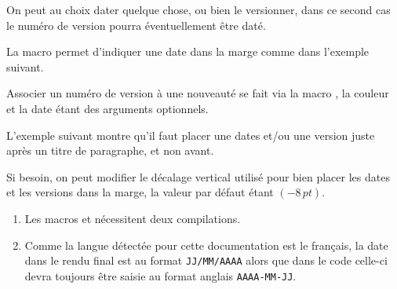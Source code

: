 On peut au choix dater quelque chose, ou bien le versionner, dans ce second cas le numéro de version pourra éventuellement être daté.


\begin{tdocexa}
    La macro  permet d'indiquer une date dans la marge comme dans l'exemple suivant.


\end{tdocexa}


\begin{tdocexa}
    Associer un numéro de version à une nouveauté se fait via la macro , la couleur et la date étant des arguments optionnels.


\end{tdocexa}


\begin{tdocexa}
	L'exemple suivant montre qu'il faut placer une dates et/ou une version juste après un titre de paragraphe, et non avant.


\end{tdocexa}


\begin{tdocexa}
	Si besoin, on peut modifier le décalage vertical utilisé pour bien placer les dates et les versions dans la marge, la valeur par défaut étant $(-8\,\mathit{pt})$.


\end{tdocexa}


\begin{tdocimp}
    \begin{enumerate}[wide]
        \item Les macros  et  nécessitent deux compilations.

        \item Comme la langue détectée pour cette documentation est le français, la date dans le rendu final est au format \texttt{JJ/MM/AAAA} alors que dans le code celle-ci devra toujours être saisie au format anglais \texttt{AAAA-MM-JJ}.
    \end{enumerate}
\end{tdocimp}


